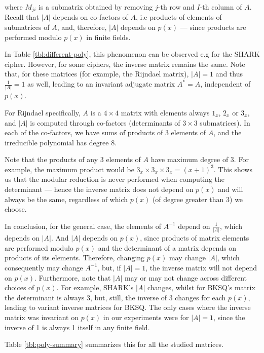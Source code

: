where $M_{ji}$ is a submatrix obtained by removing $j$-th row and $I$-th column of $A$. Recall that $|A|$ depends on co-factors of $A$, i.e products of elements of submatrices of $A$, and, therefore, $|A|$ depends on $p(x)$ --- since products are performed modulo $p(x)$ in finite fields.

In Table \ref{tbl:different-poly}, this phenomenon can be observed e.g for the SHARK cipher. However, for some ciphers, the inverse matrix remains the same. Note that, for these matrices (for example, the Rijndael matrix), $|A| = 1$ and thus $\frac{1}{|A|} = 1$ as well, leading to an invariant adjugate matrix $A^* = A$, independent of $p(x)$. 

For Rijndael specifically, $A$ is a $4\times4$ matrix with elements always $1_x$, $2_x$ or $3_x$, and $|A|$ is computed through co-factors (determinants of $3\times3$ submatrices). In each of the co-factors, we have sums of products of 3 elements of $A$, and the irreducible polynomial has degree $8$. 

Note that the products of any 3 elements of $A$ have maximum degree of 3. For example, the maximum product would be $3_x \times 3_x \times 3_x = (x+1)^3$. This shows us that the modular reduction is never performed when computing the determinant --- hence the inverse matrix does not depend on $p(x)$ and will always be the same, regardless of which $p(x)$ (of degree greater than 3) we choose.

In conclusion, for the general case, the elements of $A^{-1}$ depend on $\frac{1}{|A|}$, which depends on $|A|$. And $|A|$ depends on $p(x)$, since products of matrix elements are performed modulo $p(x)$ and the determinant of a matrix depends on products of its elements. Therefore, changing $p(x)$ may change $|A|$, which consequently may change $A^{-1}$, but, if $|A| = 1$, the inverse matrix will not depend on $p(x)$. Furthermore, note that $|A|$ may or may not change across different choices of $p(x)$. For example, SHARK's $|A|$ changes, whilst for BKSQ's matrix the determinant is always $3$, but, still, the inverse of $3$ changes for each $p(x)$, leading to variant inverse matrices for BKSQ. The only cases where the inverse matrix was invariant on $p(x)$ in our experiments were for $|A| = 1$, since the inverse of 1 is always 1 itself in any finite field.

Table \ref{tbl:poly-summary} summarizes this for all the studied matrices.

